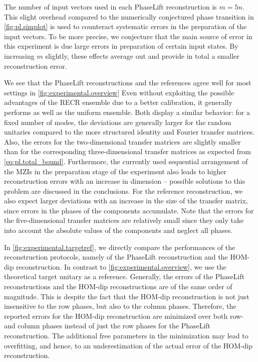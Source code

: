 The number of input vectors used in each PhaseLift reconstruction is $m = 5n$.
This slight overhead compared to the numerically conjectured phase transition in \cref{fig:pl.simplot} is used to counteract systematic errors in the preparation of the input vectors.
To be more precise, we conjecture that the main source of error in this experiment is due large errors in preparation of certain input states.
By increasing $m$ slightly, these effects average out and provide in total a smaller reconstruction error.


We see that the PhaseLift reconstructions and the references agree well for most settings in \cref{fig:experimental.overview}
Even without exploiting the possible advantages of the RECR ensemble due to a better calibration, it generally performs as well as the uniform ensemble.
Both display a similar behavior: for a fixed number of modes, the deviations are generally larger for the random unitaries compared to the more structured identity and Fourier transfer matrices.
Also, the errors for the two-dimensional transfer matrices are slightly smaller than for the corresponding three-dimensional transfer matrices as expected from \cref{eq:pl.total_bound}.
Furthermore, the currently used sequential arrangement of the MZIs in the preparation stage of the experiment also leads to higher reconstruction errors with an increase in dimension -- possible solutions to this problem are discussed in the conclusions.
For the reference reconstruction, we also expect larger deviations with an increase in the size of the transfer matrix, since errors in the phases of the components accumulate.
Note that the errors for the five-dimensional transfer matrices are relatively small since they only take into account the absolute values of the components and neglect all phases.

In \cref{fig:experimental.targetref}, we directly compare the performances of the reconstruction protocols, namely of the PhaseLift reconstruction and the HOM-dip reconstruction.
In contrast to \cref{fig:experimental.overview}, we use the theoretical target unitary as a reference.
Generally, the errors of the PhaseLift reconstructions and the HOM-dip reconstructions are of the same order of magnitude.
This is despite the fact that the HOM-dip reconstruction is not just insensitive to the row phases, but also to the column phases.
Therefore, the reported errors for the HOM-dip reconstruction are minimized over both row- and column phases instead of just the row phases for the PhaseLift reconstruction.
The additional free parameters in the minimization may lead to overfitting, and hence, to an underestimation of the actual error of the HOM-dip reconstruction.


